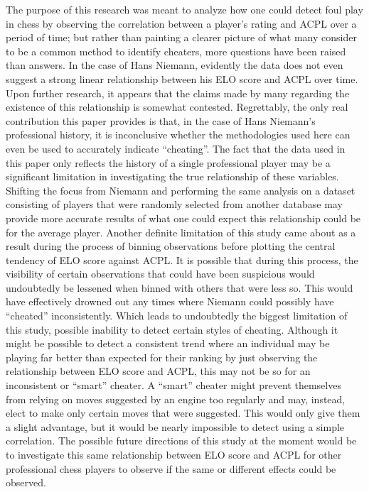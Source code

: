 \documentclass[12pt, letterpaper, titlepage]{article}
\begin{document}
The purpose of this research was meant to analyze how one could detect foul play in chess by observing the correlation between a player's rating and ACPL over a period of time; but rather than painting a clearer picture of what many consider to be a common method to identify cheaters, more questions have been raised than answers. In the case of Hans Niemann, evidently the data does not even suggest a strong linear relationship between his ELO score and ACPL over time. Upon further research, it appears that the claims made by many regarding the existence of this relationship is somewhat contested. Regrettably, the only real contribution this paper provides is that, in the case of Hans Niemann's professional history, it is inconclusive whether the methodologies used here can even be used to accurately indicate “cheating”. The fact that the data used in this paper only reflects the history of a single professional player may be a significant limitation in investigating the true relationship of these variables. Shifting the focus from Niemann and performing the same analysis on a dataset consisting of players that were randomly selected from another database may provide more accurate results of what one could expect this relationship could be for the average player. Another definite limitation of this study came about as a result during the process of binning observations before plotting the central tendency of ELO score against ACPL. It is possible that during this process, the visibility of certain observations that could have been suspicious would undoubtedly be lessened when binned with others that were less so. This would have effectively drowned out any times where Niemann could possibly have “cheated” inconsistently. Which leads to undoubtedly the biggest limitation of this study, possible inability to detect certain styles of cheating. Although it might be possible to detect a consistent trend where an individual may be playing far better than expected for their ranking by just observing the relationship between ELO score and ACPL, this may not be so for an inconsistent or “smart” cheater. A “smart” cheater might prevent themselves from relying on moves suggested by an engine too regularly and may, instead, elect to make only certain moves that were suggested. This would only give them a slight advantage, but it would be nearly impossible to detect using a simple correlation. The possible future directions of this study at the moment would be to investigate this same relationship between ELO score and ACPL for other professional chess players to observe if the same or different effects could be observed.



\end{document}
